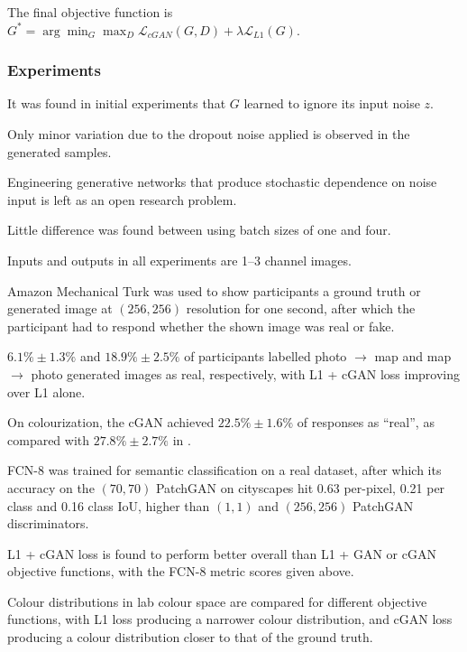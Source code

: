 \documentclass[a4paper, 12pt]{article}
\begin{document}
The final objective function is
$G^* = \arg\min_G \max_D \mathcal{L}_{cGAN}\left(G, D\right) + \lambda \mathcal{L}_{L1}\left(G\right)$.

\subsubsection{Experiments}

It was found in initial experiments that $G$ learned to ignore its input noise
$z$.

Only minor variation due to the dropout noise applied is observed in the
generated samples.

Engineering generative networks that produce stochastic dependence on noise
input is left as an open research problem.

Little difference was found between using batch sizes of one and four.

Inputs and outputs in all experiments are 1--3 channel images.

Amazon Mechanical Turk was used to show participants a ground truth or
generated image at $(256, 256)$ resolution for one second, after which the
participant had to respond whether the shown image was real or fake.

$6.1\% \pm 1.3\%$ and $18.9\% \pm 2.5\%$ of participants labelled photo
$\rightarrow$ map and map $\rightarrow$ photo generated images as real,
respectively, with L1 + cGAN loss improving over L1 alone.

On colourization, the cGAN achieved $22.5\% \pm 1.6\%$ of responses as
``real'', as compared with $27.8\% \pm 2.7\%$ in
\citet{DBLP:journals/corr/ZhangIE16}.

FCN-8 was trained for semantic classification on a real dataset, after which
its accuracy on the $(70, 70)$ PatchGAN on cityscapes hit 0.63 per-pixel, 0.21 per
class and 0.16 class IoU, higher than $(1, 1)$ and $(256, 256)$ PatchGAN
discriminators.


L1 + cGAN loss is found to perform better overall than L1 + GAN or cGAN
objective functions, with the FCN-8 metric scores given above.

Colour distributions in lab colour space are compared for different objective
functions, with L1 loss producing a narrower colour distribution, and cGAN loss
producing a colour distribution closer to that of the ground truth.
\end{document}
